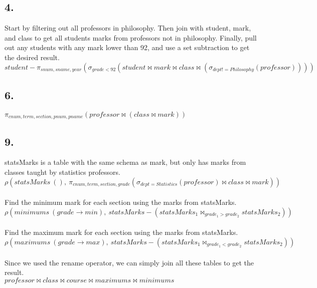 \documentclass[12pt]{article}
\begin{document}
\subsection*{4.}
Start by filtering out all professors in philosophy.  Then join with student,
mark, and class to get all students marks from professors not in philosophy.
Finally, pull out any students with any mark lower than 92, and use a set
subtraction to get the desired result. \\
$student - \pi_{snum, sname, year}(\sigma_{grade < 92}(student \bowtie mark \bowtie class \bowtie (\sigma_{dept!=Philosophy}(professor))))$

\subsection*{6.}
$\pi_{cnum, term, section, pnum, pname}(professor \bowtie (class \bowtie mark))$

\subsection*{9.}
statsMarks is a table with the same schema as mark, but only has marks from classes taught by statistics professors.\\
$\rho(statsMarks\ (),\ \pi_{cnum, term, section, grade}(\sigma_{dept=Statistics}(professor) \bowtie class \bowtie mark))$ \\
\\
Find the minimum mark for each section using the marks from statsMarks. \\
$\rho(minimums\ (grade\rightarrow min),\ statsMarks - (statsMarks_1 \bowtie_{grade_1 > grade_2} statsMarks_2))$ \\
\\
Find the maximum mark for each section using the marks from statsMarks. \\
$\rho(maximums\ (grade\rightarrow max),\ statsMarks - (statsMarks_1 \bowtie_{grade_1 < grade_2} statsMarks_2))$ \\
\\
Since we used the rename operator, we can simply join all these tables to get the result. \\
$professor \bowtie class \bowtie course \bowtie maximums \bowtie minimums$
\end{document}
